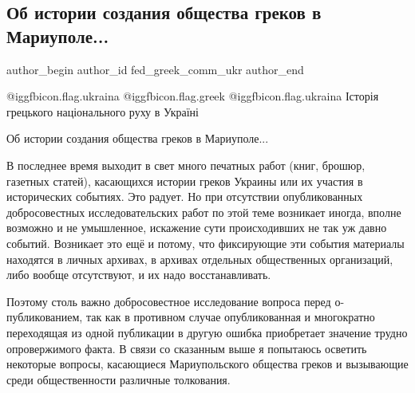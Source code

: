  
 
 
 
 

\subsection{Об истории создания общества греков в Мариуполе...}
\label{sec:10_11_2021.fb.fed_greek_comm_ukr.1.ob_istorii_sozdania_obschestva_grekov_v_mariupole}

\ifcmt
 author_begin
   author_id fed_greek_comm_ukr
 author_end
\fi

@igg{fbicon.flag.ukraina} @igg{fbicon.flag.greek} @igg{fbicon.flag.ukraina} Історія грецького національного руху в Україні

Об истории  создания общества греков в Мариуполе...


В последнее время выходит в свет много печатных работ (книг, брошюр, газетных
статей), касающихся истории греков Украины или их участия в исторических
событиях. Это радует. Но при отсутствии опубликованных добросовестных
исследовательских работ по этой теме возникает иногда, вполне возможно и не
умышленное, искажение сути происходивших не так уж давно событий. Возникает это
ещё и потому, что фиксирующие эти события материалы находятся в личных архивах,
в архивах отдельных общественных организаций, либо вообще отсутствуют, и их
надо восстанавливать. 

Поэтому столь важно добросовестное исследование вопроса перед о\hyp{}публикованием,
так как в противном случае опубликованная и многократно переходящая из одной
публикации в другую ошибка приобретает значение трудно опровержимого факта. В
связи со сказанным выше я попытаюсь осветить некоторые вопросы, касающиеся
Мариупольского общества греков и вызывающие среди общественности различные
толкования.

